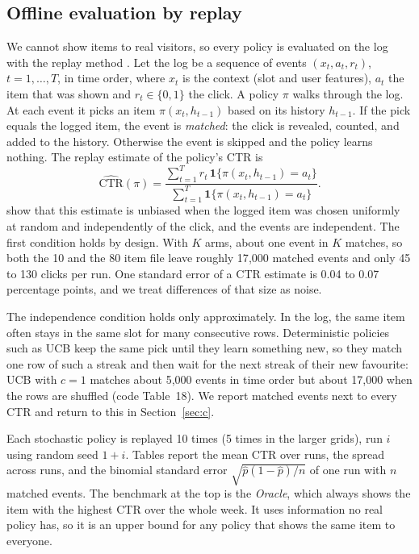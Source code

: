 \documentclass[11pt]{article}
\begin{document}
\subsection{Offline evaluation by replay}
\label{sec:replay}

We cannot show items to real visitors, so every policy is evaluated on the
log with the replay method \citep{li2011}. Let the log be a sequence of
events $(x_t, a_t, r_t)$, $t = 1,\dots,T$, in time order, where $x_t$ is the
context (slot and user features), $a_t$ the item that was shown and
$r_t \in \{0,1\}$ the click. A policy $\pi$ walks through the log. At each
event it picks an item $\pi(x_t, h_{t-1})$ based on its history $h_{t-1}$. If
the pick equals the logged item, the event is \emph{matched}: the click is
revealed, counted, and added to the history. Otherwise the event is skipped
and the policy learns nothing. The replay estimate of the policy's CTR is
%
\begin{equation}
  \widehat{\text{CTR}}(\pi)
  = \frac{\sum_{t=1}^{T} r_t \,\mathbf{1}\{\pi(x_t,h_{t-1}) = a_t\}}
         {\sum_{t=1}^{T} \mathbf{1}\{\pi(x_t,h_{t-1}) = a_t\}} .
  \label{eq:replay}
\end{equation}
%
\citet{li2011} show that this estimate is unbiased when the logged item was
chosen uniformly at random and independently of the click, and the events are
independent. The first condition holds by design. With $K$ arms, about one
event in $K$ matches, so both the 10 and the 80 item file leave roughly
17{,}000 matched events and only 45 to 130 clicks per run. One standard error
of a CTR estimate is 0.04 to 0.07 percentage points, and we treat differences
of that size as noise.

The independence condition holds only approximately. In the log, the same
item often stays in the same slot for many consecutive rows. Deterministic
policies such as UCB keep the same pick until they learn something new, so
they match one row of such a streak and then wait for the next streak of
their new favourite: UCB with $c=1$ matches about 5{,}000 events in time order
but about 17{,}000 when the rows are shuffled (code Table~18). We report
matched events next to every CTR and return to this in Section~\ref{sec:c}.

Each stochastic policy is replayed 10 times (5 times in the larger grids),
run $i$ using random seed $1+i$. Tables report the mean CTR over runs, the
spread across runs, and the binomial standard error
$\sqrt{\hat p(1-\hat p)/n}$ of one run with $n$ matched events. The benchmark
at the top is the \emph{Oracle}, which always shows the item with the highest
CTR over the whole week. It uses information no real policy has, so it is an
upper bound for any policy that shows the same item to everyone.
\end{document}
